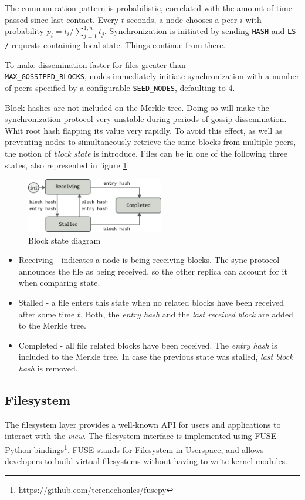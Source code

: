 \documentclass{sig-alternate}
\begin{document}
The communication pattern is probabilistic, correlated with the amount of time passed since last contact. Every $t$ seconds, a node chooses a peer $i$ with probability $p_i = t_i/\sum_{j=1}^{1,n} t_j$. Synchronization is initiated by sending \texttt{HASH} and \texttt{LS /} requests containing local state. Things continue from there.

To make dissemination faster for files greater than \\ \texttt{MAX\_GOSSIPED\_BLOCKS}, nodes immediately initiate synchronization with a number of peers specified by a configurable \texttt{SEED\_NODES}, defaulting to 4.

Block hashes are not included on the Merkle tree. Doing so will make the synchronization protocol very unstable during periods of gossip dissemination. Whit root hash flapping its value very rapidly. To avoid this effect, as well as preventing nodes to simultaneously retrieve the same blocks from multiple peers, the notion of \textit{block state} is introduce. Files can be in one of the following three states, also represented in figure \ref{fig:blockstate}:

\begin{figure}
\centering
\includegraphics[width=170pt]{imgs/blockstate.png}
\caption{Block state diagram}
\label{fig:blockstate}
\end{figure}


\begin{itemize}
\item Receiving - indicates a node is being receiving blocks. The sync protocol announces the file as being received, so the other replica can account for it when comparing state.
\item Stalled - a file enters this state when no related blocks have been received after some time $t$. Both, the \textit{entry hash} and the \textit{last received block} are added to the Merkle tree.
\item Completed - all file related blocks have been received. The \textit{entry hash} is included to the Merkle tree. In case the previous state was stalled, \textit{last block hash} is removed.
\end{itemize}


\subsection{Filesystem}\label{filesystem}
The filesystem layer provides a well-known API for users and applications to interact with the \textit{view}. The filesystem interface is implemented using FUSE Python bindings\footnote{\url{https://github.com/terencehonles/fusepy}}. FUSE stands for Filesystem in Userspace, and allows developers to build virtual filesystems without having to write kernel modules.
\end{document}
